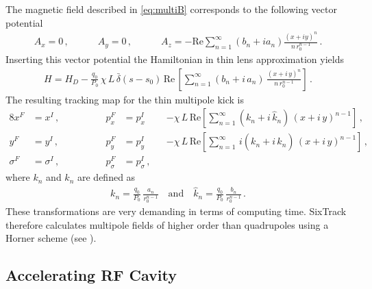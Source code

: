 The magnetic field described in \eqref{eq:multiB} corresponds to the following vector potential
%
\begin{align}
A_x = 0 \, , \quad \quad \quad A_y = 0 \, , \quad \quad \quad A_z = - \text{Re} \sum_{n=1}^{\infty} (b_n + i a_n) \frac{(x+i y)^n}{n \, r_0^{n-1}} \, .
\end{align} 
%
Inserting this vector potential the Hamiltonian in thin lens approximation yields
%
\begin{align}
  H = H_D - \frac{q_0}{P_0} \, \chi \, L \, \bar{\delta}(s-s_0) \, \text{Re} \, \left[ \sum_{n=1}^\infty (b_n + i \, a_n) \, \frac{(x+i \, y)^n}{n \, r_0^{n-1}}  \right]  \, .
\end{align}
%
The resulting tracking map for the thin multipole kick is
%
\begin{alignat}{8}
x^F & =  x^I \, ,  \quad \quad \quad \quad &p_x^F &=   p_x^I &&-  \chi \, L \, \text{Re} \left[ \sum_{n=1}^\infty (k_n+ i \, \hat{k}_n) \, (x+i\,y)^{n-1}    \right] \,, \\ 
y^F & =  y^I \, ,  \quad \quad \quad \quad &p_y^F &=  p_y^I && -  \chi \, L \, \text{Re} \left[ \sum_{n=1}^\infty \, i (k_n+ i \, \hat{k}_n) \, (x+i\,y)^{n-1}    \right] \,,\\ 
\sigma^F & =  \sigma^I \, ,  \quad \quad \quad \quad &p_\sigma^F &=  p_\sigma^I \,, &&  &
\end{alignat}
%
where $k_n$ and $\hat{k}_n$ are defined as
%
\begin{align}
  k_n = \frac{q_0}{P_0} \, \frac{a_n}{r_0^{n-1}} \quad \text{and} \quad   \hat{k}_n = \frac{q_0}{P_0} \, \frac{b_n}{r_0^{n-1}} \, .
\end{align}
These transformations are very demanding in terms of computing time. SixTrack therefore calculates multipole fields of higher order than quadrupoles using a Horner scheme (see ).

\subsection{Accelerating RF Cavity}


